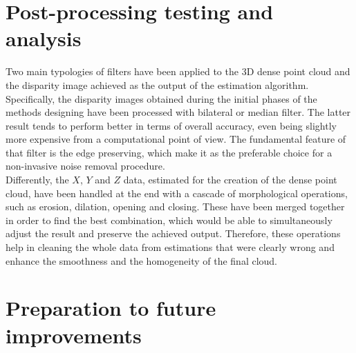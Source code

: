 \section{Post-processing testing and analysis}
\label{section:post-processing-impl}

Two main typologies of filters have been applied to the 3D dense point cloud and the disparity image achieved as the output of the estimation algorithm.\\
Specifically, the disparity images obtained during the initial phases of the methods designing have been processed with bilateral or median filter.
The latter result tends to perform better in terms of overall accuracy, even being slightly more expensive from a computational point of view.
The fundamental feature of that filter is the edge preserving, which make it as the preferable choice for a non-invasive noise removal procedure.\\
Differently, the $X$, $Y$ and $Z$ data, estimated for the creation of the dense point cloud, have been handled at the end with a cascade of morphological operations, such as erosion, dilation, opening and closing.
These have been merged together in order to find the best combination, which would be able to simultaneously adjust the result and preserve the achieved output.
Therefore, these operations help in cleaning the whole data from estimations that were clearly wrong and enhance the smoothness and the homogeneity of the final cloud.
	
\section{Preparation to future improvements}
\label{section:intro-future-improv}

